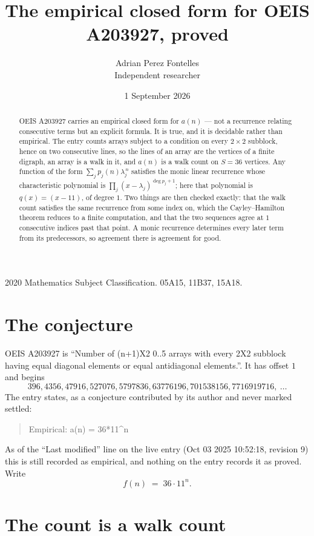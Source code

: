 \documentclass[11pt,a4paper]{article}
\title{The empirical closed form for OEIS A203927, proved}
\author{Adrian Perez Fontelles\\ \small Independent researcher}
\date{1 September 2026}
\theoremstyle{plain}
\theoremstyle{definition}
\begin{document}
\maketitle

\begin{abstract}
OEIS A203927 carries an empirical closed form for $a(n)$ --- not a recurrence relating
consecutive terms but an explicit formula. It is true, and it is decidable rather than
empirical. The entry counts arrays subject to a condition on every $2\times2$ subblock, hence on two consecutive lines, so the lines of an array are the
vertices of a finite digraph, an array is a walk in it, and $a(n)$ is a walk count on
$S=36$ vertices. Any function of the form $\sum_j p_j(n)\lambda_j^{\,n}$ satisfies the
monic linear recurrence whose characteristic polynomial is
$\prod_j(x-\lambda_j)^{\deg p_j+1}$; here that polynomial is $q(x)=(x-11)$, of degree
$1$. Two things are then checked exactly: that the walk count satisfies the same
recurrence from some index on, which the Cayley--Hamilton theorem reduces to a finite
computation, and that the two sequences agree at $1$ consecutive indices past that
point. A monic recurrence determines every later term from its predecessors, so agreement
there is agreement for good.
\end{abstract}

\noindent\small 2020 Mathematics Subject Classification. 05A15, 11B37, 15A18.\normalsize

\section{The conjecture}

OEIS A203927 is ``Number of (n+1)X2 0..5 arrays with every 2X2 subblock having equal diagonal elements or equal antidiagonal elements.''. It has offset $1$ and begins
\[
396, 4356, 47916, 527076, 5797836, 63776196, 701538156, 7716919716,\ \dots
\]
The entry states, as a conjecture contributed by its author and never marked settled:
\begin{quote}
Empirical: a(n) = 36*11\^{}n
\end{quote}
As of the ``Last modified'' line on the live entry (Oct 03 2025 10:52:18, revision 9) this is still
recorded as empirical, and nothing on the entry records it as proved. Write
\[
f(n)\;=\;36 \cdot 11^{n}.
\]

\section{The count is a walk count}
\end{document}
